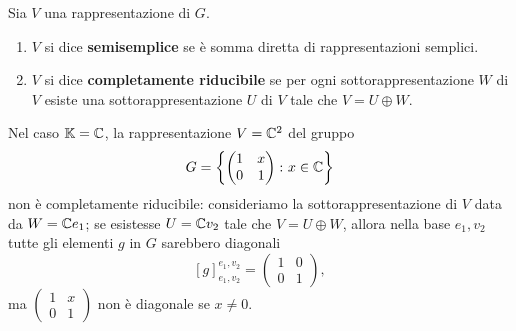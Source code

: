 \begin{definition}
    Sia $V$ una rappresentazione di $G$. \begin{enumerate}
        \item $V$ si dice \textbf{semisemplice} se è somma diretta di rappresentazioni semplici.
        \item $V$ si dice \textbf{completamente riducibile} se per ogni sottorappresentazione $W$ di $V$ esiste una sottorappresentazione $U$ di $V$ tale che $V=U\oplus W$.
    \end{enumerate}
\end{definition}
\begin{example}
    Nel caso $\mathbb{K}=\mathbb{C}$, la rappresentazione $V=\mathbb{C}^2$ del gruppo \[G=\left\{\begin{pmatrix}
        1 & x \\ 
        0 & 1
    \end{pmatrix} \colon x\in \mathbb{C}\right\}\] non è completamente riducibile: consideriamo la sottorappresentazione di $V$ data da $W=\mathbb{C} e_1$; se esistesse $U=\mathbb{C} v_2$ tale che $V=U\oplus W$, allora nella base $e_1,v_2$ tutte gli elementi $g$ in $G$ sarebbero diagonali \[[g]_{e_1,v_2}^{e_1,v_2}=\begin{pmatrix}
        1 & 0 \\ 
        0 & 1
    \end{pmatrix},\]
    ma $\begin{pmatrix}
        1 & x \\ 
        0 & 1
    \end{pmatrix}$ non è diagonale se $x\ne 0$.
\end{example}

